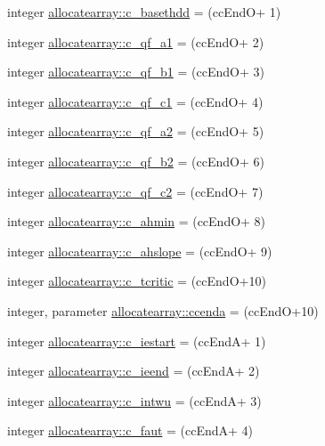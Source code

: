 \begin{DoxyCompactItemize}
\item 
integer \hyperlink{namespaceallocatearray_aa77a8cbacfed015c662b9225f95325cf}{allocatearray\+::c\+\_\+basethdd} = (cc\+EndO+ 1)
\item 
integer \hyperlink{namespaceallocatearray_af23df58aebe7b1273ec66a6e9f9a3310}{allocatearray\+::c\+\_\+qf\+\_\+a1} = (cc\+EndO+ 2)
\item 
integer \hyperlink{namespaceallocatearray_a5dac1791d2320a56ba97265778353290}{allocatearray\+::c\+\_\+qf\+\_\+b1} = (cc\+EndO+ 3)
\item 
integer \hyperlink{namespaceallocatearray_a17cce5e7c3e285684d0237da33d9147d}{allocatearray\+::c\+\_\+qf\+\_\+c1} = (cc\+EndO+ 4)
\item 
integer \hyperlink{namespaceallocatearray_a447c1747b013dfc70d3428e9decd1118}{allocatearray\+::c\+\_\+qf\+\_\+a2} = (cc\+EndO+ 5)
\item 
integer \hyperlink{namespaceallocatearray_a2ce50744f82721acb57ca92da1352f3d}{allocatearray\+::c\+\_\+qf\+\_\+b2} = (cc\+EndO+ 6)
\item 
integer \hyperlink{namespaceallocatearray_a8e5d39962fa81f4e9eeb4c4e8d80b5c7}{allocatearray\+::c\+\_\+qf\+\_\+c2} = (cc\+EndO+ 7)
\item 
integer \hyperlink{namespaceallocatearray_ae9a2fabfb3c96a65abc7658a20cc96e4}{allocatearray\+::c\+\_\+ahmin} = (cc\+EndO+ 8)
\item 
integer \hyperlink{namespaceallocatearray_a7ec4c5b36ffc6e561a665ed0610bcfdc}{allocatearray\+::c\+\_\+ahslope} = (cc\+EndO+ 9)
\item 
integer \hyperlink{namespaceallocatearray_abe5ad402b720ef5716ceb8120aca3611}{allocatearray\+::c\+\_\+tcritic} = (cc\+EndO+10)
\item 
integer, parameter \hyperlink{namespaceallocatearray_a46bae68e8ba9e3b02713186773f60f5c}{allocatearray\+::ccenda} = (cc\+EndO+10)
\item 
integer \hyperlink{namespaceallocatearray_a843f1c5df3eceab017e76237dbd6f89f}{allocatearray\+::c\+\_\+iestart} = (cc\+EndA+ 1)
\item 
integer \hyperlink{namespaceallocatearray_aac513d5c2f6bd570ee8ece0bd5d55d11}{allocatearray\+::c\+\_\+ieend} = (cc\+EndA+ 2)
\item 
integer \hyperlink{namespaceallocatearray_a924d021792ec209f52debd87b3b234f7}{allocatearray\+::c\+\_\+intwu} = (cc\+EndA+ 3)
\item 
integer \hyperlink{namespaceallocatearray_afe130fb4e5703304158597061af686f9}{allocatearray\+::c\+\_\+faut} = (cc\+EndA+ 4)

\end{DoxyCompactItemize}
